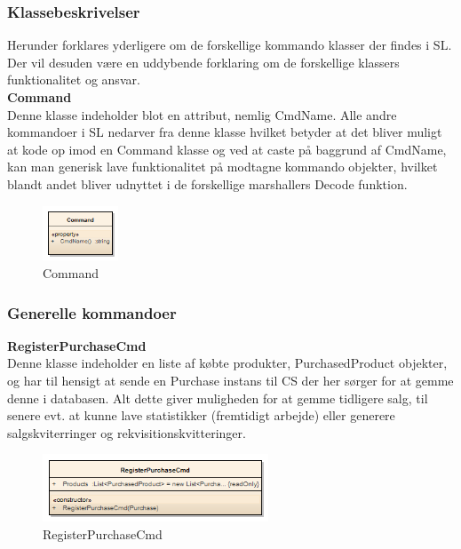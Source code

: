\subsubsection{Klassebeskrivelser}
Herunder forklares yderligere om de forskellige kommando klasser der findes i \gls{SL}. Der vil desuden være en uddybende forklaring om de forskellige klassers funktionalitet og ansvar.\\

\textbf{Command}\\
Denne klasse indeholder blot en attribut, nemlig CmdName. Alle andre kommandoer i \gls{SL} nedarver fra denne klasse hvilket betyder at det bliver muligt at kode op imod en Command klasse og ved at caste på baggrund af CmdName, kan man generisk lave funktionalitet på modtagne kommando objekter, hvilket blandt andet bliver udnyttet i de forskellige marshallers Decode funktion.

\begin{figure}[H]
    \centering
    \includegraphics[width=0.2\textwidth]{Systemdesign/SharedLib/Images/Klasser/Command/Command.png}
    \caption{Command}
    \label{fig:klasseCMDCommand}
\end{figure}

\subsubsection*{Generelle kommandoer}

\textbf{RegisterPurchaseCmd}\\
Denne klasse indeholder en liste af købte produkter, PurchasedProduct objekter, og har til hensigt at sende en Purchase instans til \gls{CS} der her sørger for at gemme denne i databasen. Alt dette giver muligheden for at gemme tidligere salg, til senere evt. at kunne lave statistikker (fremtidigt arbejde) eller generere salgskviterringer og rekvisitionskvitteringer.

\begin{figure}[H]
    \centering
    \includegraphics[width=0.6\textwidth]{Systemdesign/SharedLib/Images/Klasser/Command/RegisterPurchase.png}
    \caption{RegisterPurchaseCmd}
    \label{fig:klasseCMDRegP}
\end{figure}


